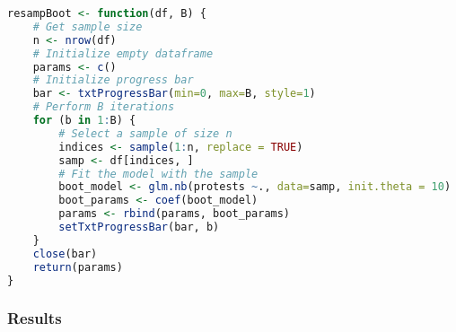 \documentclass[12pt]{article}
\begin{document}
\vspace{1cm}
\begin{lstlisting}[language=R]
resampBoot <- function(df, B) {
    # Get sample size
    n <- nrow(df)
    # Initialize empty dataframe
    params <- c()
    # Initialize progress bar
    bar <- txtProgressBar(min=0, max=B, style=1)
    # Perform B iterations
    for (b in 1:B) {
        # Select a sample of size n
        indices <- sample(1:n, replace = TRUE)
        samp <- df[indices, ]
        # Fit the model with the sample
        boot_model <- glm.nb(protests ~., data=samp, init.theta = 10)
        boot_params <- coef(boot_model)
        params <- rbind(params, boot_params)
        setTxtProgressBar(bar, b)
    }
    close(bar)
    return(params)
}
\end{lstlisting}

\subsubsection*{Results}
\end{document}
